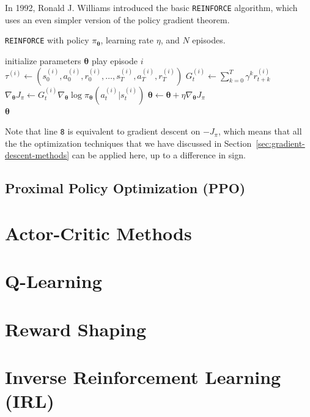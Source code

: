 \documentclass[12pt]{report}
\theoremstyle{definition}
\theoremstyle{remark}
\begin{document}
In 1992, Ronald J. Williams introduced the basic \texttt{REINFORCE} algorithm, which uses an even simpler version of the policy gradient theorem.~\cite{williams_simple_1992}
\begin{algorithm}
    \caption{\texttt{REINFORCE} with policy $\pi_{\boldsymbol{\theta}}$, learning rate $\eta$, and $N$ episodes.}\label{alg:REINFORCE}
    \begin{algorithmic}[1]
        \State initialize parameters $\boldsymbol{\theta}$
            \State play episode $i$
            \State $\tau^{(i)} \leftarrow (s_0^{(i)}, a_0^{(i)}, r_0^{(i)}, \ldots, s_T^{(i)}, a_T^{(i)}, r_T^{(i)})$
                \State $G_t^{(i)} \leftarrow \sum_{k=0}^{T} \gamma^k r_{t+k}^{(i)}$
                \State $\nabla_{\boldsymbol{\theta}} J_\pi \leftarrow G_t^{(i)} \nabla_{\boldsymbol{\theta}} \log \pi_{\boldsymbol{\theta}}(a_t^{(i)} | s_t^{(i)})$
                \State $\boldsymbol{\theta} \leftarrow \boldsymbol{\theta} + \eta \nabla_{\boldsymbol{\theta}} J_\pi$
            \EndFor
        \EndFor \\
        \Return $\boldsymbol{\theta}$
    \end{algorithmic}
\end{algorithm}
Note that line \texttt{8} is equivalent to gradient descent on $-J_\pi$, which means that all the the optimization techniques that we have discussed in Section~\ref{sec:gradient-descent-methods} can be applied here, up to a difference in sign.


\subsection{Proximal Policy Optimization (PPO)}
\cite{schulman_proximal_2017}

\section{Actor-Critic Methods}

\section{Q-Learning}

\section{Reward Shaping}

\section{Inverse Reinforcement Learning (IRL)}
\end{document}
